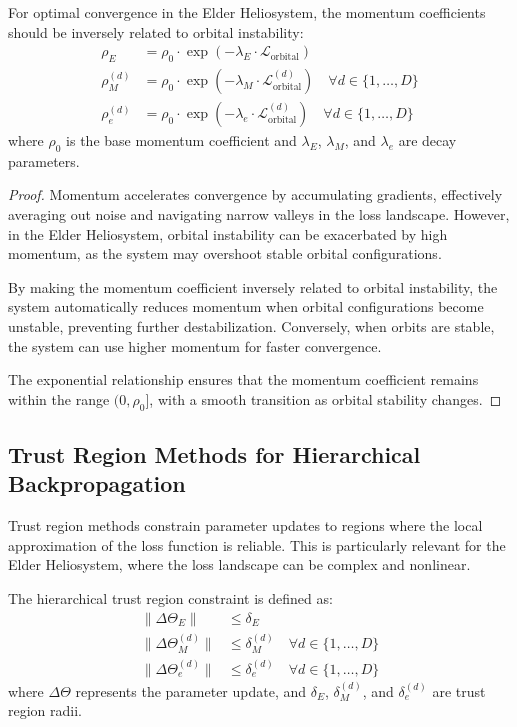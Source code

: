 \begin{theorem}
For optimal convergence in the Elder Heliosystem, the momentum coefficients should be inversely related to orbital instability:
\begin{align}
\rho_E &= \rho_0 \cdot \exp\left(-\lambda_E \cdot \mathcal{L}_{\text{orbital}}\right) \\
\rho_M^{(d)} &= \rho_0 \cdot \exp\left(-\lambda_M \cdot \mathcal{L}_{\text{orbital}}^{(d)}\right) \quad \forall d \in \{1, \ldots, D\} \\
\rho_e^{(d)} &= \rho_0 \cdot \exp\left(-\lambda_e \cdot \mathcal{L}_{\text{orbital}}^{(d)}\right) \quad \forall d \in \{1, \ldots, D\}
\end{align}
where $\rho_0$ is the base momentum coefficient and $\lambda_E$, $\lambda_M$, and $\lambda_e$ are decay parameters.
\end{theorem}

\begin{proof}
Momentum accelerates convergence by accumulating gradients, effectively averaging out noise and navigating narrow valleys in the loss landscape. However, in the Elder Heliosystem, orbital instability can be exacerbated by high momentum, as the system may overshoot stable orbital configurations.

By making the momentum coefficient inversely related to orbital instability, the system automatically reduces momentum when orbital configurations become unstable, preventing further destabilization. Conversely, when orbits are stable, the system can use higher momentum for faster convergence.

The exponential relationship ensures that the momentum coefficient remains within the range $(0, \rho_0]$, with a smooth transition as orbital stability changes.
\end{proof}

\subsection{Trust Region Methods for Hierarchical Backpropagation}

Trust region methods constrain parameter updates to regions where the local approximation of the loss function is reliable. This is particularly relevant for the Elder Heliosystem, where the loss landscape can be complex and nonlinear.

\begin{definition}
The hierarchical trust region constraint is defined as:
\begin{align}
\|\Delta \Theta_E\| &\leq \delta_E \\
\|\Delta \Theta_M^{(d)}\| &\leq \delta_M^{(d)} \quad \forall d \in \{1, \ldots, D\} \\
\|\Delta \Theta_e^{(d)}\| &\leq \delta_e^{(d)} \quad \forall d \in \{1, \ldots, D\}
\end{align}
where $\Delta \Theta$ represents the parameter update, and $\delta_E$, $\delta_M^{(d)}$, and $\delta_e^{(d)}$ are trust region radii.
\end{definition}

